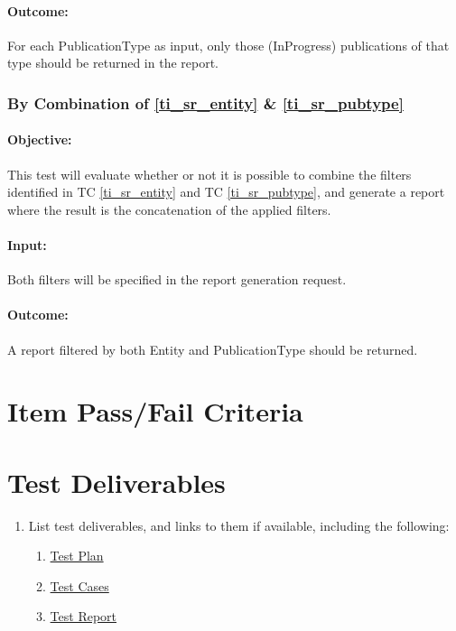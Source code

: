 \paragraph{Outcome:}
For each PublicationType as input, only those (InProgress) publications of that type should be returned in the report.

\subsubsection{By Combination of \ref{ti_sr_entity} \& \ref{ti_sr_pubtype}}
\paragraph{Objective:}
This test will evaluate whether or not it is possible to combine the filters identified in TC \ref{ti_sr_entity} and TC \ref{ti_sr_pubtype}, and generate a report where the result is the concatenation of the applied filters.
\paragraph{Input:}
Both filters will be specified in the report generation request.
\paragraph{Outcome:}
A report filtered by both Entity and PublicationType should be returned.

\section{Item Pass/Fail Criteria}
  
\section{Test Deliverables}

\begin{enumerate}
	\item List test deliverables, and links to them if available, including the following:

\begin{enumerate}
	\item \hyperlink{labelp}{Test Plan} 
	\item \hyperlink{label}{Test Cases} 
	\item \hyperlink{labelr}{Test Report} 
\end{enumerate}
\end{enumerate} 
